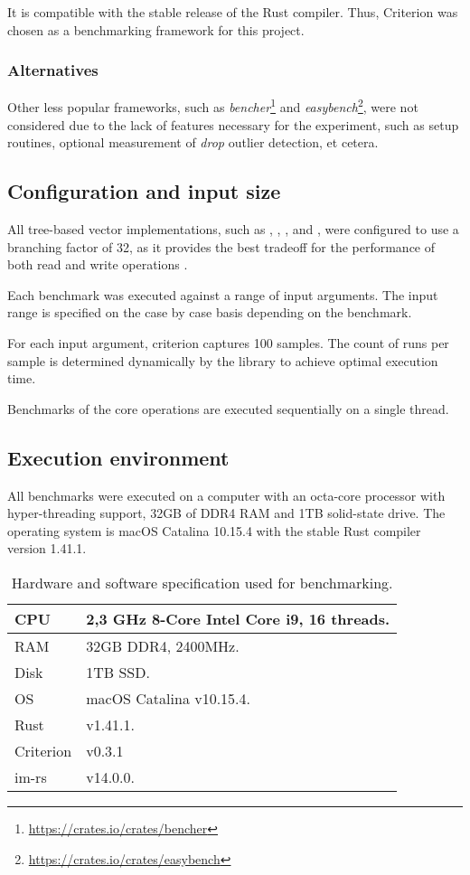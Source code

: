 It is compatible with the stable release of the Rust compiler. Thus, Criterion was chosen as a benchmarking framework for this project.

\subsubsection*{Alternatives}
Other less popular frameworks, such as \emph{bencher}\footnote{\url{https://crates.io/crates/bencher}} and \emph{easybench}\footnote{\url{https://crates.io/crates/easybench}}, were not considered due to the lack of features necessary for the experiment, such as setup routines, optional measurement of \emph{drop} outlier detection, et cetera.

\subsection{Configuration and input size}
All tree-based vector implementations, such as \rbvec{}, \rrbvec{}, \pvec{}, and \imrsvec{}, were configured to use a branching factor of 32, as it provides the best tradeoff for the performance of both read and write operations \cite{efficient-immutable-vectors}.

Each benchmark was executed against a range of input arguments. The input range is specified on the case by case basis depending on the benchmark.

For each input argument, criterion captures 100 samples. The count of runs per sample is determined dynamically by the library to achieve optimal execution time.

Benchmarks of the core operations are executed sequentially on a single thread.

\subsection{Execution environment}
All benchmarks were executed on a computer with an octa-core processor with hyper-threading support, 32GB of DDR4 RAM and 1TB solid-state drive. The operating system is macOS Catalina 10.15.4 with the stable Rust compiler version 1.41.1.

\begin{table}[!htbp]
    \centering

    \begin{tabular} { |l| p{11cm} | }
        \hline CPU & 2,3 GHz 8-Core Intel Core i9, 16 threads. \\ \hline
        RAM & 32GB DDR4, 2400MHz. \\ \hline
        Disk & 1TB SSD. \\ \hline
        OS & macOS Catalina v10.15.4. \\ \hline
        Rust & v1.41.1. \\ \hline
        Criterion & v0.3.1 \\ \hline
        im-rs & v14.0.0. \\ \hline
    \end{tabular}

    \label{tab:exec-environment}
    \caption{Hardware and software specification used for benchmarking.}
\end{table}

